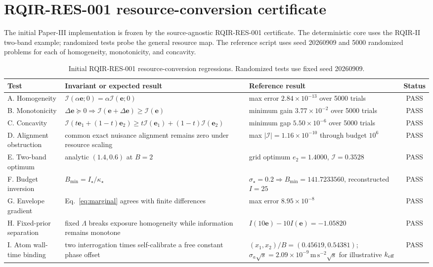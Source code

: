 \section{RQIR-RES-001 resource-conversion certificate}
\label{sec:certificate}

The initial Paper-III implementation is frozen by the source-agnostic RQIR-RES-001 certificate. The deterministic core uses the RQIR-II two-band example; randomized tests probe the general resource map. The reference script uses seed 20260909 and 5000 randomized problems for each of homogeneity, monotonicity, and concavity.

\begin{table}[t]
\caption{Initial RQIR-RES-001 resource-conversion regressions. Randomized tests use fixed seed 20260909.}
\label{tab:resource-certificate}
\begin{ruledtabular}
\begin{tabular}{p{}p{}p{}c}
Test & Invariant or expected result & Reference result & Status\\
\hline
A. Homogeneity & $\mathcal I(\alpha\bm e;0)=\alpha\mathcal I(\bm e;0)$ & max error $2.84\times10^{-13}$ over 5000 trials & PASS\\
B. Monotonicity & $\Delta\bm e\succeq0\Rightarrow\mathcal I(\bm e+\Delta\bm e)\ge\mathcal I(\bm e)$ & minimum gain $3.77\times10^{-2}$ over 5000 trials & PASS\\
C. Concavity & $\mathcal I(t\bm e_1+(1-t)\bm e_2)\ge t\mathcal I(\bm e_1)+(1-t)\mathcal I(\bm e_2)$ & minimum gap $5.50\times10^{-6}$ over 5000 trials & PASS\\
D. Alignment obstruction & common exact nuisance alignment remains zero under resource scaling & max $|\mathcal I|=1.16\times10^{-10}$ through budget $10^6$ & PASS\\
E. Two-band optimum & analytic $(1.4,0.6)$ at $B=2$ & grid optimum $e_2=1.4000$, $\mathcal I=0.3528$ & PASS\\
F. Budget inversion & $B_{\min}=I_\star/\kappa_\star$ & $\sigma_\star=0.2\Rightarrow B_{\min}=141.7233560$, reconstructed $I=25$ & PASS\\
G. Envelope gradient & Eq.~\eqref{eq:marginal} agrees with finite differences & max error $8.95\times10^{-8}$ & PASS\\
H. Fixed-prior separation & fixed $\Lambda$ breaks exposure homogeneity while information remains monotone & $I(10\bm e)-10I(\bm e)=-1.05820$ & PASS\\
I. Atom wall-time binding & two interrogation times self-calibrate a free constant phase offset & $(x_1,x_2)/B=(0.45619,0.54381)$; $\sigma_a\sqrt{s}=2.09\times10^{-9}\,\mathrm{m\,s^{-2}\sqrt{s}}$ for illustrative $k_{\rm eff}$ & PASS\\
\end{tabular}
\end{ruledtabular}
\end{table}

